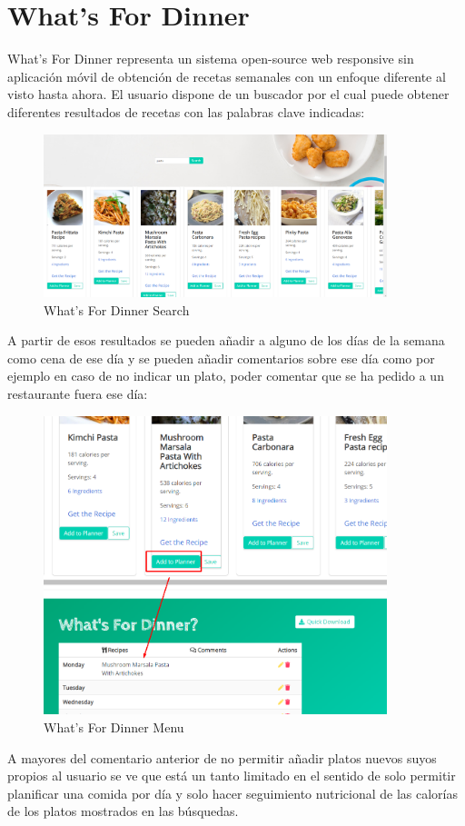 \documentclass[12pt, a4paper, twoside]{book}
\begin{document}
	\section{What's For Dinner}
	What's For Dinner representa un sistema open-source web responsive sin aplicación móvil de obtención de recetas semanales con un enfoque diferente al visto hasta ahora.
	El usuario dispone de un buscador por el cual puede obtener diferentes resultados de recetas con las palabras clave indicadas:
	\begin{center}
		\begin{figure}[H]
			\centering
			\includegraphics[width=10cm]{Imagenes/WhatsForDinnerSearch.png}
			\caption{What's For Dinner Search}\label{What's For Dinner Search}
		\end{figure}
	\end{center}
	A partir de esos resultados se pueden añadir a alguno de los días de la semana como cena de ese día y se pueden añadir comentarios sobre ese día como por ejemplo en caso de no indicar un plato, poder comentar que se ha pedido a un restaurante fuera ese día:
	\begin{center}
		\begin{figure}[H]
			\centering
			\includegraphics[width=10cm]{Imagenes/WhatsForDinnerMenu.png}
			\caption{What's For Dinner Menu}\label{What's For Dinner Menu}
		\end{figure}
	\end{center}
	A mayores del comentario anterior de no permitir añadir platos nuevos suyos propios al usuario se ve que está un tanto limitado en el sentido de solo permitir planificar una comida por día y solo hacer seguimiento nutricional de las calorías de los platos mostrados en las búsquedas.
	
\end{document}
